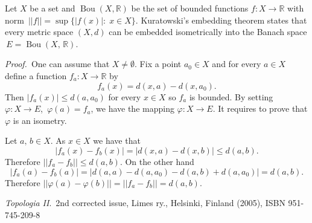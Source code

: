 \documentclass[12pt]{article}
\begin{document}
Let $X$ be a set and $\operatorname{Bou}(X,\mathbb{R})$ be the set of bounded functions $f:X\to\mathbb{R}$ with norm \,$||f||=\operatorname{sup}\{|f(x)|:\;x\in X\}$.  Kuratowski's embedding theorem states that every metric space $(X,d)$ can be embedded isometrically into the Banach space \,$E=\operatorname{Bou}(X,\,\mathbb{R})$.

{\em Proof.}\,
One can assume that $X\ne \emptyset$.  Fix a point $a_0\in X$ and for every $a\in X$ define a function $f_a:X\to\mathbb{R}$ by
\[f_a(x)=d(x,a)-d(x,a_0).\]
Then $|f_a(x)|\leq d(a,a_0)$ for every $x\in X$ so $f_a$ is bounded. By setting \,$\varphi :X\to E$,\, $\varphi (a)=f_a$, we have the mapping $\varphi : X\to E$.  It requires to prove that $\varphi$ is an isometry.

Let $a,\,b\in X$.  As $x\in X$ we have that
\[|f_a(x)-f_b(x)|=|d(x,a)-d(x,b)|\leq d(a,b).\]
Therefore $||f_a-f_b||\leq d(a,b)$.  On the other hand
\[|f_a(a)-f_b(a)|=|d(a,a)-d(a,a_0)-d(a,b)+d(a,a_0)|=d(a,b).\]
Therefore $||\varphi (a)-\varphi (b)||=||f_a-f_b||=d(a,b)$.
\begin{thebibliography}{9}
 {\em Topologia II}.\, 2nd corrected issue, Limes ry., Helsinki, Finland (2005), ISBN 951-745-209-8
\end{thebibliography}
\end{document}
